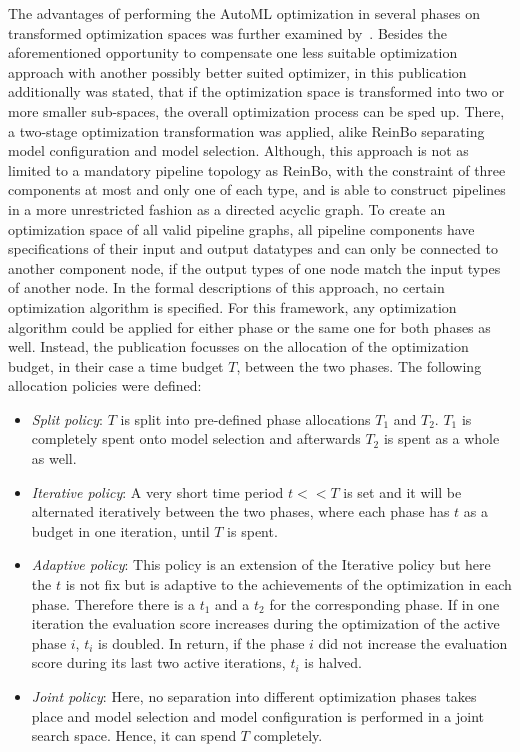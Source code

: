 The advantages of performing the AutoML optimization in several phases on transformed optimization spaces was further examined by~\textcite{Quemy-Two-Stage-Optimization}.
Besides the aforementioned opportunity to compensate one less suitable optimization approach with another possibly better suited optimizer, in this publication additionally was stated, that if the optimization space is transformed into two or more smaller sub-spaces, the overall optimization process can be sped up.
There, a two-stage optimization transformation was applied, alike ReinBo separating model configuration and model selection.
Although, this approach is not as limited to a mandatory pipeline topology as ReinBo, with the constraint of three components at most and only one of each type, and is able to construct pipelines in a more unrestricted fashion as a directed acyclic graph.
To create an optimization space of all valid pipeline graphs, all pipeline components have specifications of their input and output datatypes and can only be connected to another component node, if the output types of one node match the input types of another node.\newline
In the formal descriptions of this approach, no certain optimization algorithm is specified.
For this framework, any optimization algorithm could be applied for either phase or the same one for both phases as well.
Instead, the publication focusses on the allocation of the optimization budget, in their case a time budget $T$, between the two phases.
The following allocation policies were defined:
\begin{itemize}
    \item \textit{Split policy}: $T$ is split into pre-defined phase allocations $T_1$ and $T_2$. $T_1$ is completely spent onto model selection and afterwards $T_2$ is spent as a whole as well.
    \item \textit{Iterative policy}: A very short time period $t << T$ is set and it will be alternated iteratively between the two phases, where each phase has $t$ as a budget in one iteration, until $T$ is spent.
    \item \textit{Adaptive policy}: This policy is an extension of the Iterative policy but here the $t$ is not fix but is adaptive to the achievements of the optimization in each phase.
    Therefore there is a $t_1$ and a $t_2$ for the corresponding phase.
    If in one iteration the evaluation score increases during the optimization of the active phase $i$, $t_i$ is doubled.
    In return, if the phase $i$ did not increase the evaluation score during its last two active iterations, $t_i$ is halved.
    \item \textit{Joint policy}: Here, no separation into different optimization phases takes place and model selection and model configuration is performed in a joint search space.
    Hence, it can spend $T$ completely.
\end{itemize}



